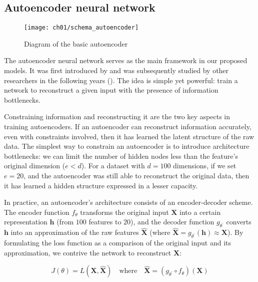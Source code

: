 \newpage
\subsection{Autoencoder neural network}

\begin{wrapfigure}{r}{0.5\textwidth}
  \centering
  \texttt{[image: ch01/schema\_autoencoder]}
  \caption[Diagram of the basic autoencoder]{
      Diagram of the basic autoencoder
  }
  \label{schema:autoencoder}
\end{wrapfigure}

\par The autoencoder neural network serves as the main framework in our
proposed models.  It was first introduced by \cite{lecun1987phd} and
was subsequently studied by other researchers in the following years
(\cite{bourlard1988auto, hinton1994autoencoders}). The idea is simple yet
powerful: train a network to reconstruct a given input with the
presence of information bottlenecks.

\par Constraining information and reconstructing it are the two key aspects in
training autoencoders. If an autoencoder can reconstruct information
accurately, even with constraints involved, then it has learned the latent
structure of the raw data. The simplest way to constrain an autoencoder is to
introduce architecture bottlenecks: we can limit the number of hidden nodes
less than the feature's original dimension ($e<d$). For a dataset with
$d=100$ dimensions, if we set $e=20$, and the autoencoder was still able to
reconstruct the original data, then it has learned a hidden structure expressed
in a lesser capacity.

\par In practice, an autoencoder's architecture consists of an encoder-decoder
scheme. The encoder function $f_{\theta}$ transforms the original input
$\mathbf{X}$ into a certain representation $\mathbf{h}$ (from $100$ features to
$20$), and the decoder function $g_{\theta^{\prime}}$ converts $\mathbf{h}$
into an approximation of the raw features $\mathbf{\widehat{X}}$ (where
$\mathbf{\widehat{X}} = g_{\theta^{\prime}}(\mathbf{h}) \approx \mathbf{X}$).
By formulating the loss function as a comparison of the original input and its
approximation, we  contrive the network to reconstruct $\mathbf{X}$:

\[
    J(\theta) = L(\mathbf{X}, \mathbf{\widehat{X}}) \quad \text{where} \quad
    \mathbf{\widehat{X}} = (g_{\theta^{\prime}} \circ f_{\theta}) (\mathbf{X})
\]

